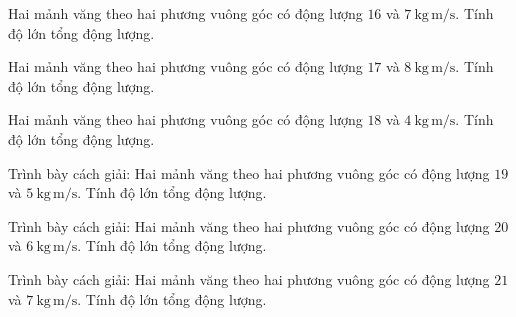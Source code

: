 \begin{ex}
Hai mảnh văng theo hai phương vuông góc có động lượng $16$ và $7\ \mathrm{kg\,m/s}$. Tính độ lớn tổng động lượng.
\end{ex}

\begin{ex}
Hai mảnh văng theo hai phương vuông góc có động lượng $17$ và $8\ \mathrm{kg\,m/s}$. Tính độ lớn tổng động lượng.
\end{ex}

\begin{ex}
Hai mảnh văng theo hai phương vuông góc có động lượng $18$ và $4\ \mathrm{kg\,m/s}$. Tính độ lớn tổng động lượng.
\end{ex}

\begin{bt}
Trình bày cách giải: Hai mảnh văng theo hai phương vuông góc có động lượng $19$ và $5\ \mathrm{kg\,m/s}$. Tính độ lớn tổng động lượng.
\end{bt}

\begin{bt}
Trình bày cách giải: Hai mảnh văng theo hai phương vuông góc có động lượng $20$ và $6\ \mathrm{kg\,m/s}$. Tính độ lớn tổng động lượng.
\end{bt}

\begin{bt}
Trình bày cách giải: Hai mảnh văng theo hai phương vuông góc có động lượng $21$ và $7\ \mathrm{kg\,m/s}$. Tính độ lớn tổng động lượng.
\end{bt}

